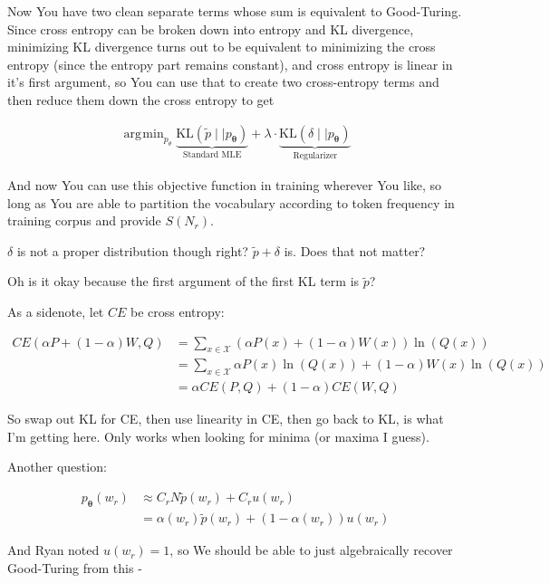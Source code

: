 \documentclass{article}
\DeclareMathOperator*{\argmin}{\arg\!\min}
\newcommand{\KL}{\mathrm{KL}}
\newcommand{\vtheta}{\boldsymbol{\theta}}
\newcommand{\model}{p_{\vtheta}}
\begin{document}
	    Now You have two clean separate terms whose sum is equivalent to Good-Turing. Since cross entropy can be broken down into entropy and KL divergence, minimizing KL divergence turns out to be equivalent to minimizing the cross entropy (since the entropy part remains constant), and cross entropy is linear in it's first argument, so You can use that to create two cross-entropy terms and then reduce them down the cross entropy to get
	    
	    \begin{align}
	    	\argmin_{p_\theta} \underbrace{\KL(\tilde{p}\mid\mid\model)}_{\text{Standard MLE}} + \lambda \cdot \underbrace{\KL(\delta\mid\mid\model)}_{\text{Regularizer}}
	    \end{align}
	    
	    And now You can use this objective function in training wherever You like, so long as You are able to partition the vocabulary according to token frequency in training corpus and provide $S(N_r)$.
	    
	    $\delta$ is not a proper distribution though right? $\tilde{p} + \delta$ is. Does that not matter?
	    
	    Oh is it okay because the first argument of the first KL term is $\tilde{p}$?
	
	    As a sidenote, let $CE$ be cross entropy:
	    
	    \begin{align}
			CE(\alpha P+(1-\alpha)W, Q) &= \sum_{x\in\mathcal{X}} (\alpha P(x)+(1-\alpha)W(x))\ln(Q(x))\\
			&= \sum_{x\in\mathcal{X}} \alpha P(x)\ln(Q(x)) +(1-\alpha)W(x)\ln(Q(x))\\
			&= \alpha CE(P, Q) + (1-\alpha)CE(W, Q)
		\end{align}
		
		So swap out KL for CE, then use linearity in CE, then go back to KL, is what I'm getting here. Only works when looking for minima (or maxima I guess).
		
		Another question:
		
		\begin{align}
	    	\model(w_r) &\approx C_r N\tilde{p}(w_r) + C_r u(w_r)\\
	    	&= \alpha(w_r)\tilde{p}(w_r) + (1-\alpha(w_r)) u(w_r)
	    \end{align}
		
		And Ryan noted $u(w_r)=1$, so We should be able to just algebraically recover Good-Turing from this - 
		
\end{document}
